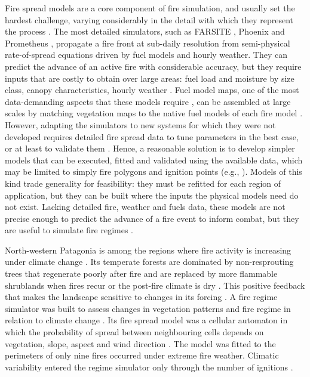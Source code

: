 \documentclass[ResearchPaper,linenum]{CSIRO_LaTeX_Template}
\begin{document}
Fire spread models are a core component of fire simulation,
and usually set the hardest challenge, varying considerably in 
the detail with which they represent the process
\citep{sullivan2009wildland, papadopoulos2011comparative}. 
The most detailed simulators, such as FARSITE \citep{finney1998farsite}, 
Phoenix \citep{tolhurst2008phoenix} and Prometheus \citep{tymstra2010development}, 
propagate a fire front at sub-daily resolution from semi-physical 
rate-of-spread equations \citep{rothermel_mathematical_1972,van_wagner_development_1987}
driven by fuel models and hourly weather. They can predict the advance of an active 
fire with considerable accuracy, but they require inputs that are costly to obtain over 
large areas: fuel load and moisture by size class, canopy characteristics, hourly weather
\citep{finney2005challenge, papadopoulos2011comparative}. 
Fuel model maps, one of the most data-demanding aspects that these models
require \citep{keane_describing_2013, parresol_developing_2012}, can be assembled at
large scales by matching vegetation maps to the native fuel models of each fire model
\citep{salis_predicting_2016, price_modeling_2022}. However, adapting the simulators to
new systems for which they were not developed requires detailed fire spread data to
tune parameters in the best case, or at least to validate them
\citep{arca_evaluation_2007, cruz_uncertainty_2013}.
Hence, a reasonable solution is to develop simpler models that can
be executed, fitted and validated using the available data, which may be 
limited to simply fire polygons and ignition points 
(e.g., \citealt{morales_stochastic_2015}). 
Models of this kind trade generality for feasibility: they must be refitted 
for each region of application, but they can be built where the inputs 
the physical models need do not exist. Lacking detailed fire, weather and 
fuels data, these models are not precise enough to predict the advance of 
a fire event to inform combat, but they are useful to simulate fire regimes 
\citep{parisien2020commentary}.

North-western Patagonia is among the regions where fire activity is 
increasing under climate change 
\citep{kitzberger_projections_2022,barbera_patterns}. 
Its temperate forests are dominated by non-resprouting trees that 
regenerate poorly after fire and are replaced by more flammable 
shrublands when fires recur or the post-fire climate is
dry \citep{kitzberger_firevegetation_2016}. 
This positive feedback that makes the landscape sensitive to changes in its forcing
\citep{kitzberger_firevegetation_2016, tiribelli_non-additive_2019}. 
A fire regime simulator was built to assess changes in vegetation patterns and 
fire regime in relation to climate change 
\citep{tiribelli_non-additive_2019, kitzberger_projections_2022}.
Its fire spread model was a cellular automaton in which the probability of spread between
neighbouring cells depends on vegetation, slope, aspect and wind
direction \citep{morales_stochastic_2015}. The model was fitted 
to the perimeters of only nine fires occurred under extreme fire weather.
Climatic variability entered the regime simulator only through the number of
ignitions \citep{kitzberger_projections_2022}.
\end{document}
